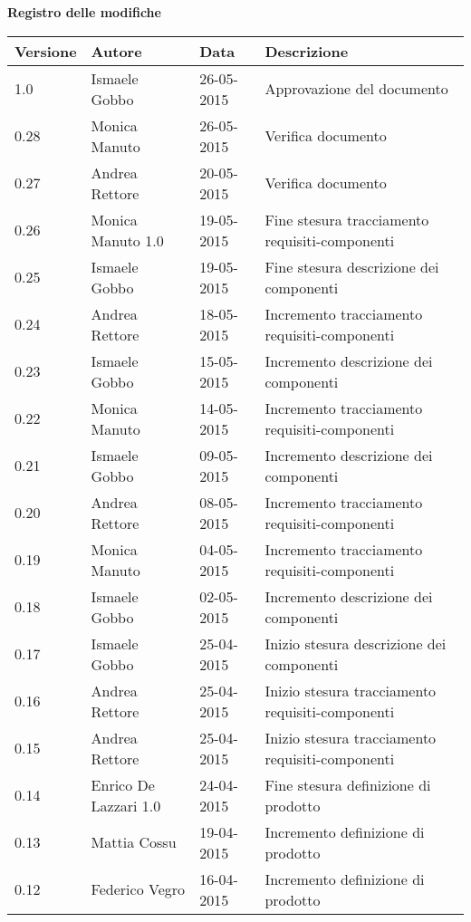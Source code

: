 \begin{Large}
	\textbf{Registro delle modifiche}
\end{Large}

\begin{longtable}{|l|l|l|p{}|}
\hline
\textbf{Versione} & \textbf{Autore} & \textbf{Data} & \textbf{Descrizione} \\

\hline
1.0 & Ismaele Gobbo & 26-05-2015 & Approvazione del documento \\
\hline
0.28 & Monica Manuto & 26-05-2015 & Verifica documento \\
\hline
0.27 & Andrea Rettore & 20-05-2015 & Verifica documento \\
\hline
0.26 & Monica Manuto 1.0 & 19-05-2015 & Fine stesura tracciamento requisiti-componenti \\
\hline
0.25 & Ismaele Gobbo & 19-05-2015 & Fine stesura descrizione dei componenti \\
\hline
0.24 & Andrea Rettore & 18-05-2015 & Incremento tracciamento requisiti-componenti \\
\hline
0.23 & Ismaele Gobbo & 15-05-2015 & Incremento descrizione dei componenti \\
\hline
0.22 & Monica Manuto & 14-05-2015 & Incremento tracciamento requisiti-componenti \\
\hline
0.21 & Ismaele Gobbo & 09-05-2015 & Incremento descrizione dei componenti \\
\hline
0.20 & Andrea Rettore & 08-05-2015 & Incremento tracciamento requisiti-componenti \\
\hline
0.19 & Monica Manuto & 04-05-2015 & Incremento tracciamento requisiti-componenti \\
\hline
0.18 & Ismaele Gobbo & 02-05-2015 & Incremento descrizione dei componenti \\
\hline
0.17 & Ismaele Gobbo & 25-04-2015 & Inizio stesura descrizione dei componenti \\
\hline
0.16 & Andrea Rettore & 25-04-2015 & Inizio stesura tracciamento requisiti-componenti \\
\hline
0.15 & Andrea Rettore & 25-04-2015 & Inizio stesura tracciamento requisiti-componenti \\
\hline
0.14 & Enrico De Lazzari 1.0 & 24-04-2015 & Fine stesura definizione di prodotto \\
\hline
0.13 & Mattia Cossu & 19-04-2015 & Incremento definizione di prodotto \\
\hline
0.12 & Federico Vegro & 16-04-2015 & Incremento definizione di prodotto \\

\end{longtable}

